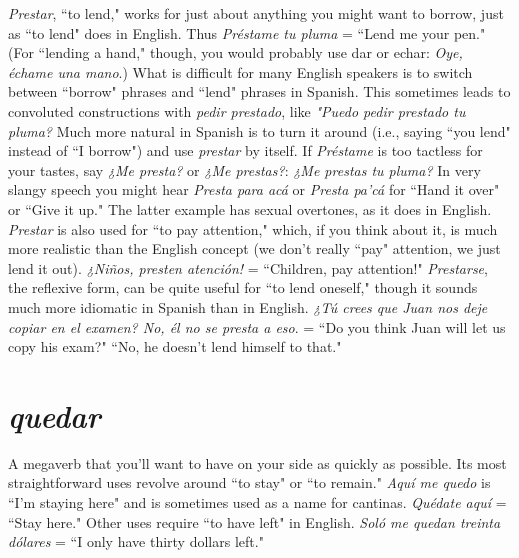 \emph{Prestar}, ``to lend," works for just about anything you might
want to borrow, just as ``to lend" does in English. Thus \emph{Préstame tu
pluma} = ``Lend me your pen." (For ``lending a hand," though, you
would probably use dar or echar: \emph{Oye, échame una mano}.) What is
difficult for many English speakers is to switch between ``borrow"
phrases and ``lend" phrases in Spanish. This sometimes leads to convoluted constructions with \emph{pedir prestado}, like \emph{"Puedo pedir prestado tu
pluma?} Much more natural in Spanish is to turn it around (i.e., saying
``you lend" instead of ``I borrow") and use \emph{prestar} by itself. If \emph{Préstame}
is too tactless for your tastes, say \emph{¿Me presta?} or \emph{¿Me prestas?}: \emph{¿Me
prestas tu pluma?} In very slangy speech you might hear \emph{Presta para
acá} or \emph{Presta pa'cá} for ``Hand it over" or ``Give it up." The latter example has sexual overtones, as it does in English.
\emph{Prestar} is also used for ``to pay attention," which, if you think
about it, is much more realistic than the English concept (we don't really ``pay" attention, we just lend it out). \emph{¿Niños, presten atención!} =
``Children, pay attention!" \emph{Prestarse}, the reflexive form, can be quite
useful for ``to lend oneself," though it sounds much more idiomatic in
Spanish than in English. \emph{¿Tú crees que Juan nos deje copiar en el examen? No, él no se presta a eso}. = ``Do you think Juan will let us copy
his exam?" ``No, he doesn't lend himself to that."

\section{\emph{quedar}}

A megaverb that you'll want to have on your side as quickly as
possible. Its most straightforward uses revolve around ``to stay" or ``to
remain." \emph{Aquí me quedo} is ``I'm staying here" and is sometimes used
as a name for cantinas. \emph{Quédate aquí} = ``Stay here." Other uses
require ``to have left" in English. \emph{Soló me quedan treinta dólares} = ``I
only have thirty dollars left."

